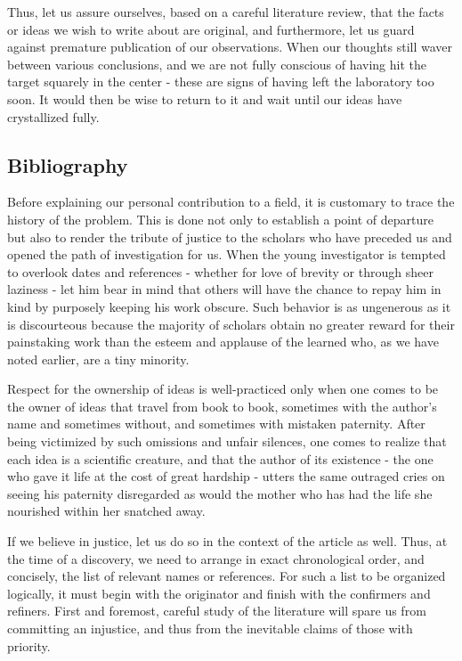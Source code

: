 \documentclass{article}
\begin{document}
Thus, let us assure ourselves, based on a careful literature review, that the facts or ideas we wish to write about are original, and furthermore, let us guard against premature publication of our observations. When our thoughts still waver between various conclusions, and we are not fully conscious of having hit the target squarely in the center - these are signs of having left the laboratory too soon. It would then be wise to return to it and wait until our ideas have crystallized fully.

\subsection*{Bibliography}

Before explaining our personal contribution to a field, it is customary to trace the history of the problem. This is done not only to establish a point of departure but also to render the tribute of justice to the scholars who have preceded us and opened the path of investigation for us. When the young investigator is tempted to overlook dates and references - whether for love of brevity or through sheer laziness - let him bear in mind that others will have the chance to repay him in kind by purposely keeping his work obscure. Such behavior is as ungenerous as it is discourteous because the majority of scholars obtain no greater reward for their painstaking work than the esteem and applause of the learned who, as we have noted earlier, are a tiny minority.

Respect for the ownership of ideas is well-practiced only when one comes to be the owner of ideas that travel from book to book, sometimes with the author’s name and sometimes without, and sometimes with mistaken paternity. After being victimized by such omissions and unfair silences, one comes to realize that each idea is a scientific creature, and that the author of its existence - the one who gave it life at the cost of great hardship - utters the same outraged cries on seeing his paternity disregarded as would the mother who has had the life she nourished within her snatched away.

If we believe in justice, let us do so in the context of the article as well. Thus, at the time of a discovery, we need to arrange in exact chronological order, and concisely, the list of relevant names or references. For such a list to be organized logically, it must begin with the originator and finish with the confirmers and refiners. First and foremost, careful study of the literature will spare us from committing an injustice, and thus from the inevitable claims of those with priority.
\end{document}
